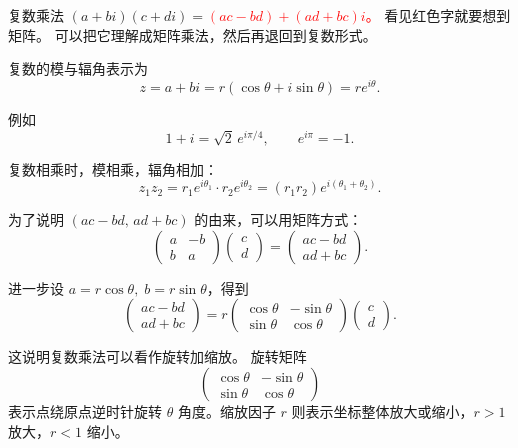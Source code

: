 \documentclass[lang=cn,10pt]{elegantbook}
\begin{document}
复数乘法 $(a+bi)(c+di) = $\textcolor{red}{$(ac - bd) + (ad + bc)i$。 } 看见红色字就要想到矩阵。
可以把它理解成矩阵乘法，然后再退回到复数形式。  

复数的模与辐角表示为  
\[
z = a + bi = r(\cos\theta + i \sin\theta) = r e^{i\theta}.
\]  

例如  
\[
1+i = \sqrt{2}\, e^{i \pi/4}, 
\qquad e^{i\pi} = -1.
\]  

复数相乘时，模相乘，辐角相加：  
\[
z_1 z_2 = r_1 e^{i\theta_1} \cdot r_2 e^{i\theta_2} = (r_1 r_2) e^{i(\theta_1+\theta_2)}.
\]  

为了说明 $(ac-bd,\, ad+bc)$ 的由来，可以用矩阵方式：  
\[
\begin{pmatrix}
a & -b \\
b & a
\end{pmatrix}
\begin{pmatrix}
c \\ d
\end{pmatrix}
=
\begin{pmatrix}
ac - bd \\
ad + bc
\end{pmatrix}.
\]  

进一步设 $a = r \cos\theta, \; b = r \sin\theta$，得到  
\[
\begin{pmatrix}
ac - bd \\
ad + bc
\end{pmatrix}
=
r
\begin{pmatrix}
\cos\theta & -\sin\theta \\
\sin\theta & \cos\theta
\end{pmatrix}
\begin{pmatrix}
c \\ d
\end{pmatrix}.
\]  

这说明复数乘法可以看作旋转加缩放。
旋转矩阵
\[
\begin{pmatrix}
\cos\theta & -\sin\theta \\
\sin\theta & \cos\theta
\end{pmatrix}
\]
表示点绕原点逆时针旋转 $\theta$ 角度。缩放因子 $r$ 则表示坐标整体放大或缩小，$r>1$ 放大，$r<1$ 缩小。
\end{document}
